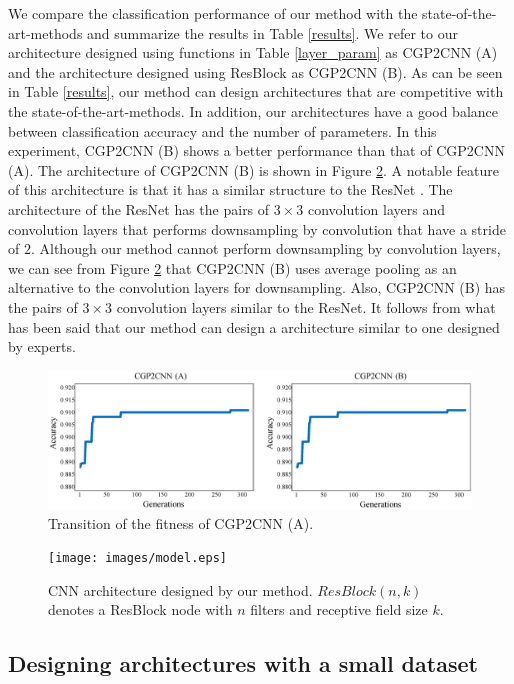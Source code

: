 We compare the classification performance of our method with the state-of-the-art-methods and summarize the results in Table \ref{results}.
We refer to our architecture designed using functions in Table \ref{layer_param} as CGP2CNN (A) and the architecture designed using ResBlock as CGP2CNN (B).
As can be seen in Table \ref{results}, our method can design architectures that are competitive with the state-of-the-art-methods.
In addition, our architectures have a good balance between classification accuracy and the number of parameters.
In this experiment, CGP2CNN (B) shows a better performance than that of CGP2CNN (A).
The architecture of CGP2CNN (B) is shown in Figure \ref{model}.
A notable feature of this architecture is that it has a similar structure to the ResNet \cite{he_deep_2016}.
The architecture of the ResNet \cite{he_deep_2016} has the pairs of $3\times 3$ convolution layers and convolution layers that performs downsampling by convolution that have a stride of $2$.
Although our method cannot perform downsampling by convolution layers, we can see from Figure \ref{model} that CGP2CNN (B) uses average pooling as an alternative to the convolution layers for downsampling.
Also, CGP2CNN (B) has the pairs of $3\times 3$ convolution layers similar to the ResNet.
It follows from what has been said that our method can design a architecture similar to one designed by experts.


\begin{figure}[!t]
\includegraphics[scale=0.4]{images/fitness.eps}
\caption{Transition of the fitness of CGP2CNN (A).}
\label{fitness}
\end{figure}

\begin{figure}[t]
\texttt{[image: images/model.eps]}
\caption{CNN architecture designed by our method. $ResBlock(n, k)$ denotes a ResBlock node with $n$ filters and receptive field size $k$.}
\label{model}
\end{figure}


\subsection{Designing architectures with a small dataset}

